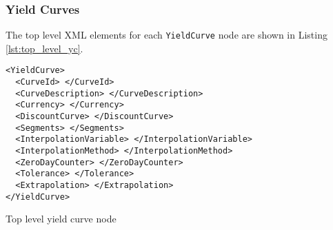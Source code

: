 \subsubsection{Yield Curves}

The top level XML elements for each \lstinline!YieldCurve! node are shown in Listing \ref{lst:top_level_yc}.

\begin{listing}[H]
\begin{verbatim}
<YieldCurve>
  <CurveId> </CurveId>
  <CurveDescription> </CurveDescription>
  <Currency> </Currency>
  <DiscountCurve> </DiscountCurve>
  <Segments> </Segments>
  <InterpolationVariable> </InterpolationVariable>
  <InterpolationMethod> </InterpolationMethod>
  <ZeroDayCounter> </ZeroDayCounter>
  <Tolerance> </Tolerance>
  <Extrapolation> </Extrapolation>
</YieldCurve>
\end{verbatim}
\caption{Top level yield curve node}
\label{lst:top_level_yc}
\end{listing}

